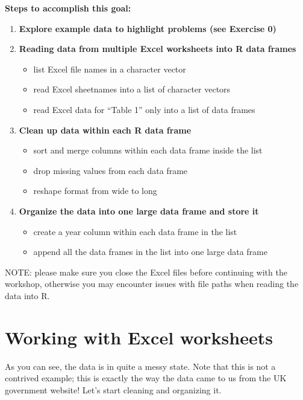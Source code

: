 \documentclass[]{book}
\providecommand{\tightlist}{%
  \setlength{\itemsep}{0pt}\setlength{\parskip}{0pt}}
\begin{document}
\textbf{Steps to accomplish this goal:}

\begin{enumerate}
\def\labelenumi{\arabic{enumi}.}
\item
  \textbf{Explore example data to highlight problems (see Exercise 0)}
\item
  \textbf{Reading data from multiple Excel worksheets into R data frames}

  \begin{itemize}
  \tightlist
  \item
    list Excel file names in a character vector
  \item
    read Excel sheetnames into a list of character vectors
  \item
    read Excel data for ``Table 1'' only into a list of data frames
  \end{itemize}
\item
  \textbf{Clean up data within each R data frame}

  \begin{itemize}
  \tightlist
  \item
    sort and merge columns within each data frame inside the list
  \item
    drop missing values from each data frame
  \item
    reshape format from wide to long
  \end{itemize}
\item
  \textbf{Organize the data into one large data frame and store it}

  \begin{itemize}
  \tightlist
  \item
    create a year column within each data frame in the list
  \item
    append all the data frames in the list into one large data frame
  \end{itemize}
\end{enumerate}

NOTE: please make sure you close the Excel files before continuing with the
workshop, otherwise you may encounter issues with file paths when reading
the data into R.

\hypertarget{working-with-excel-worksheets}{%
\section{Working with Excel worksheets}\label{working-with-excel-worksheets}}

As you can see, the data is in quite a messy state. Note that this is
not a contrived example; this is exactly the way the data came to us
from the UK government website! Let's start cleaning and organizing
it.
\end{document}
